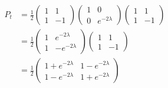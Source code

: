 \begin{align}
    P_t     &=
            \frac{1}{2}
            \begin{pmatrix}
                1 & 1               \\
                1 & -1
            \end{pmatrix}           
            \begin{pmatrix}
                1 & 0               \\
                0 & e^{-2\lambda}
            \end{pmatrix}
            \begin{pmatrix}
                1 & 1               \\
                1 & -1
            \end{pmatrix}           \\
            &=
            \frac{1}{2}
            \begin{pmatrix}
                1 & e^{-2\lambda}   \\
                1 & -e^{-2\lambda}
            \end{pmatrix}
            \begin{pmatrix}
                1 & 1               \\
                1 & -1
            \end{pmatrix}           \\
            &=
            \frac{1}{2}
            \begin{pmatrix}
                1+e^{-2\lambda} & 1-e^{-2\lambda}       \\
                1-e^{-2\lambda} & 1+e^{-2\lambda}
            \end{pmatrix}
\end{align}